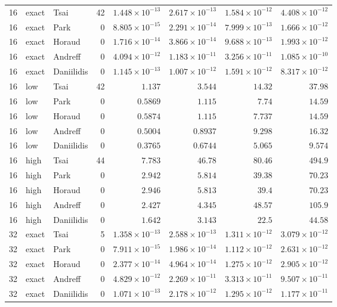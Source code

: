 \begin{longtable}{rllrrrrr}
16 & exact & Tsai & 42 & $1.448\times10^{-13}$ & $2.617\times10^{-13}$ & $1.584\times10^{-12}$ & $4.408\times10^{-12}$ \\
16 & exact & Park & 0 & $8.805\times10^{-15}$ & $2.291\times10^{-14}$ & $7.999\times10^{-13}$ & $1.666\times10^{-12}$ \\
16 & exact & Horaud & 0 & $1.716\times10^{-14}$ & $3.866\times10^{-14}$ & $9.688\times10^{-13}$ & $1.993\times10^{-12}$ \\
16 & exact & Andreff & 0 & $4.094\times10^{-12}$ & $1.183\times10^{-11}$ & $3.256\times10^{-11}$ & $1.085\times10^{-10}$ \\
16 & exact & Daniilidis & 0 & $1.145\times10^{-13}$ & $1.007\times10^{-12}$ & $1.591\times10^{-12}$ & $8.317\times10^{-12}$ \\
16 & low & Tsai & 42 & $1.137$ & $3.544$ & $14.32$ & $37.98$ \\
16 & low & Park & 0 & $0.5869$ & $1.115$ & $7.74$ & $14.59$ \\
16 & low & Horaud & 0 & $0.5874$ & $1.115$ & $7.737$ & $14.59$ \\
16 & low & Andreff & 0 & $0.5004$ & $0.8937$ & $9.298$ & $16.32$ \\
16 & low & Daniilidis & 0 & $0.3765$ & $0.6744$ & $5.065$ & $9.574$ \\
16 & high & Tsai & 44 & $7.783$ & $46.78$ & $80.46$ & $494.9$ \\
16 & high & Park & 0 & $2.942$ & $5.814$ & $39.38$ & $70.23$ \\
16 & high & Horaud & 0 & $2.946$ & $5.813$ & $39.4$ & $70.23$ \\
16 & high & Andreff & 0 & $2.427$ & $4.345$ & $48.57$ & $105.9$ \\
16 & high & Daniilidis & 0 & $1.642$ & $3.143$ & $22.5$ & $44.58$ \\
32 & exact & Tsai & 5 & $1.358\times10^{-13}$ & $2.588\times10^{-13}$ & $1.311\times10^{-12}$ & $3.079\times10^{-12}$ \\
32 & exact & Park & 0 & $7.911\times10^{-15}$ & $1.986\times10^{-14}$ & $1.112\times10^{-12}$ & $2.631\times10^{-12}$ \\
32 & exact & Horaud & 0 & $2.377\times10^{-14}$ & $4.964\times10^{-14}$ & $1.275\times10^{-12}$ & $2.905\times10^{-12}$ \\
32 & exact & Andreff & 0 & $4.829\times10^{-12}$ & $2.269\times10^{-11}$ & $3.313\times10^{-11}$ & $9.507\times10^{-11}$ \\
32 & exact & Daniilidis & 0 & $1.071\times10^{-13}$ & $2.178\times10^{-12}$ & $1.295\times10^{-12}$ & $1.177\times10^{-11}$ \\

\end{longtable}
